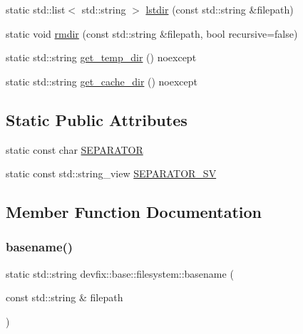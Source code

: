 \begin{DoxyCompactItemize}
\item 
static std\+::list$<$ std\+::string $>$ \hyperlink{structdevfix_1_1base_1_1filesystem_a6e922f4a97bb814d002ce058506edfec}{lstdir} (const std\+::string \&filepath)
\item 
static void \hyperlink{structdevfix_1_1base_1_1filesystem_ac0256430ab57a86e73b01695a8bff8b8}{rmdir} (const std\+::string \&filepath, bool recursive=false)
\item 
static std\+::string \hyperlink{structdevfix_1_1base_1_1filesystem_a3f724ecc2b5d49a131e4bb94bbf1ac55}{get\+\_\+temp\+\_\+dir} () noexcept
\item 
static std\+::string \hyperlink{structdevfix_1_1base_1_1filesystem_a0e49a45b063a2d85f55ac84f68b8ab1d}{get\+\_\+cache\+\_\+dir} () noexcept
\end{DoxyCompactItemize}
\subsection*{Static Public Attributes}
\begin{DoxyCompactItemize}
\item 
static const char \hyperlink{structdevfix_1_1base_1_1filesystem_ad081255decbcf3dafe5f155b7193b05b}{S\+E\+P\+A\+R\+A\+T\+OR}
\item 
static const std\+::string\+\_\+view \hyperlink{structdevfix_1_1base_1_1filesystem_abc6bdc561a5baa7b4b8da2c3cdb915b9}{S\+E\+P\+A\+R\+A\+T\+O\+R\+\_\+\+SV}
\end{DoxyCompactItemize}


\subsection{Member Function Documentation}
\mbox{\label{structdevfix_1_1base_1_1filesystem_a93c1a012676ba19073545d6fd59d6ac3}} 
\subsubsection{\texorpdfstring{basename()}{basename()}}
{\footnotesize\ttfamily static std\+::string devfix\+::base\+::filesystem\+::basename (\begin{DoxyParamCaption}\item[{const std\+::string \&}]{filepath }\end{DoxyParamCaption})\hspace{0.3cm}{\ttfamily [static]}}

